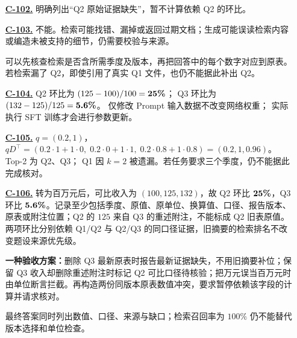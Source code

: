 \begin{enumerate}[label={},leftmargin=4.8em,itemsep=4pt]
\item[\textbf{\hyperref[exercise:missing-evidence-response]{C-102.}}] \leavevmode{}\label{solution:C-102}\label{solution:missing-evidence-response}明确列出“Q2 原始证据缺失”，暂不计算依赖 Q2 的环比。
\item[\textbf{\hyperref[exercise:rag-failure-modes]{C-103.}}] \leavevmode{}\label{solution:C-103}\label{solution:rag-failure-modes}不能。检索可能找错、漏掉或返回过期文档；生成可能误读检索内容或编造未被支持的细节，仍需要校验与来源。\par 可以先核查检索是否含所需季度及版本，再把回答中的每个数字对应到原表。若检索漏了 Q2，即使引用了真实 Q1 文件，也仍不能据此补出 Q2。
\item[\textbf{\hyperref[exercise:quarterly-evidence-update]{C-104.}}] \leavevmode{}\label{solution:C-104}\label{solution:quarterly-evidence-update}Q2 环比为 $(125-100)/100=\boldsymbol{25\%}$；
Q3 环比为 $(132-125)/125=\boldsymbol{5.6\%}$。
仅修改 Prompt 输入数据不改变网络权重；
实际执行 SFT 训练才会进行参数更新。
\item[\textbf{\hyperref[exercise:rag-query-ranking]{C-105.}}] \leavevmode{}\label{solution:C-105}\label{solution:rag-query-ranking}$q=(0.2,1)$，
$qD^\top=(0.2\cdot1+1\cdot0,\;0.2\cdot0+1\cdot1,\;
0.2\cdot0.8+1\cdot0.8)=(0.2,1,0.96)$。
Top-2 为 Q2、Q3；
Q1 因 $k=2$ 被遗漏。若任务要求三个季度，仍不能据此完成核对。
\item[\textbf{\hyperref[exercise:rag-versioned-evidence-audit]{C-106.}}] \leavevmode{}\label{solution:C-106}\label{solution:rag-versioned-evidence-audit}转为百万元后，可比收入为 $(100,125,132)$，故 Q2 环比 $\boldsymbol{25\%}$，Q3 环比 $\boldsymbol{5.6\%}$。记录至少包括季度、原值、原单位、换算值、口径、报告版本、原表或附注位置；Q2 的 $125$ 来自 Q3 的重述附注，不能标成 Q2 旧表原值。两项环比分别依赖 Q1/Q2 与 Q2/Q3 的同口径证据，旧摘要的检索排名不改变题设来源优先级。\par\textbf{一种验收方案：}删除 Q3 最新原表时报告最新证据缺失，不用旧摘要补位；保留 Q3 收入却删除重述附注时标记 Q2 可比口径待核验；把万元误当百万元时由单位断言拦截。再构造两份同版本原表数值冲突，要求暂停依赖该字段的计算并请求核对。\par 最终答案同时列出数值、口径、来源与缺口；检索召回率为 $100\%$ 仍不能替代版本选择和单位检查。
\end{enumerate}
